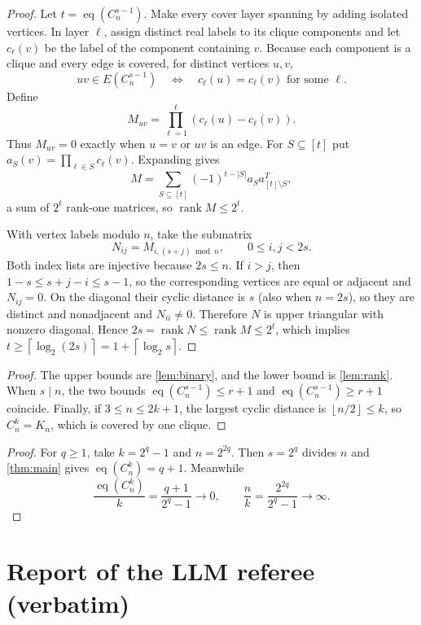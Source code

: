 \documentclass[11pt,a4paper]{article}
\theoremstyle{plain}
\theoremstyle{definition}
\theoremstyle{remark}
\newcommand{\eqc}{\operatorname{eq}}
\newcommand{\ceil}[1]{\left\lceil #1\right\rceil}
\newcommand{\floor}[1]{\left\lfloor #1\right\rfloor}
\begin{document}
\label{pf:rank}
\lemrank*
\begin{proof}
Let $t=\eqc(C_n^{s-1})$.  Make every cover layer spanning by adding isolated vertices.
In layer $\ell$, assign distinct real labels to its clique components and let
$c_\ell(v)$ be the label of the component containing $v$.  Because each component is
a clique and every edge is covered, for distinct vertices $u,v$,
\[
 uv\in E(C_n^{s-1})\quad\Longleftrightarrow\quad
 c_\ell(u)=c_\ell(v)\text{ for some }\ell.
\]
Define
\[
 M_{uv}=\prod_{\ell=1}^t(c_\ell(u)-c_\ell(v)).
\]
Thus $M_{uv}=0$ exactly when $u=v$ or $uv$ is an edge.  For $S\subseteq[t]$ put
$a_S(v)=\prod_{\ell\in S}c_\ell(v)$.  Expanding gives
\[
 M=\sum_{S\subseteq[t]}(-1)^{t-|S|}a_Sa_{[t]\setminus S}^{T},
\]
a sum of $2^t$ rank-one matrices, so $\operatorname{rank}M\le2^t$.

With vertex labels modulo $n$, take the submatrix
\[
 N_{ij}=M_{i,(s+j)\bmod n},\qquad0\le i,j<2s.
\]
Both index lists are injective because $2s\le n$.  If $i>j$, then
$1-s\le s+j-i\le s-1$, so the corresponding vertices are equal or adjacent and
$N_{ij}=0$.  On the diagonal their cyclic distance is $s$ (also when $n=2s$), so they
are distinct and nonadjacent and $N_{ii}\ne0$.  Therefore $N$ is upper triangular with
nonzero diagonal.  Hence $2s=\operatorname{rank}N\le\operatorname{rank}M\le2^t$, which
implies $t\ge\ceil{\log_2(2s)}=1+\ceil{\log_2s}$.
\end{proof}

\label{pf:main}
\thmmain*
\begin{proof}
The upper bounds are \cref{lem:binary}, and the lower bound is \cref{lem:rank}.  When
$s\mid n$, the two bounds $\eqc(C_n^{s-1})\le r+1$ and
$\eqc(C_n^{s-1})\ge r+1$ coincide.  Finally, if $3\le n\le2k+1$, the largest cyclic
distance is $\floor{n/2}\le k$, so $C_n^k=K_n$, which is covered by one clique.
\end{proof}

\label{pf:disproof}
\cordisproof*
\begin{proof}
For $q\ge1$, take $k=2^q-1$ and $n=2^{2q}$.  Then $s=2^q$ divides $n$ and
\cref{thm:main} gives $\eqc(C_n^k)=q+1$.  Meanwhile
\[
 \frac{\eqc(C_n^k)}k=\frac{q+1}{2^q-1}\longrightarrow0,
 \qquad \frac nk=\frac{2^{2q}}{2^q-1}\longrightarrow\infty.
\]
\end{proof}

\section{Report of the LLM referee (verbatim)}\label{app:referee}
\end{document}

